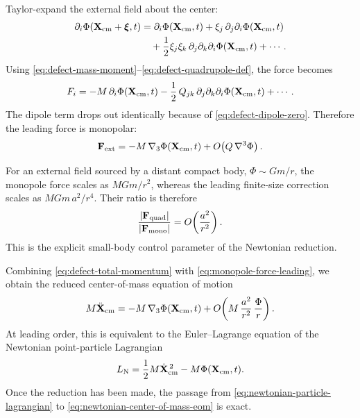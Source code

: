 \documentclass[11pt]{article}
\newcommand{\gradThree}{\nabla_3}
\newcommand{\PhiN}{\Phi}
\begin{document}
Taylor-expand the external field about the center:
\begin{align}
\partial_i \PhiN(\mathbf X_{\rm cm}+\boldsymbol{\xi},t)
&=
\partial_i\PhiN(\mathbf X_{\rm cm},t)
+
\xi_j\,\partial_j\partial_i\PhiN(\mathbf X_{\rm cm},t)
\nonumber\\
&\quad
+
\frac12\xi_j\xi_k\,\partial_j\partial_k\partial_i\PhiN(\mathbf X_{\rm cm},t)
+\cdots.
\label{eq:potential-taylor-expansion}
\end{align}
Using \eqref{eq:defect-mass-moment}--\eqref{eq:defect-quadrupole-def}, the force becomes
\begin{equation}
F_i
=
- M\,\partial_i\PhiN(\mathbf X_{\rm cm},t)
-\frac12\,Q_{jk}\,\partial_j\partial_k\partial_i\PhiN(\mathbf X_{\rm cm},t)
+\cdots.
\label{eq:force-multipole-expansion}
\end{equation}
The dipole term drops out identically because of
\eqref{eq:defect-dipole-zero}. Therefore the leading force is monopolar:
\begin{equation}
\mathbf F_{\rm ext}
=
- M\,\gradThree \PhiN(\mathbf X_{\rm cm},t)
+
O\!\left(Q\,\nabla^3\PhiN\right).
\label{eq:monopole-force-leading}
\end{equation}

For an external field sourced by a distant compact body,
\(\PhiN\sim Gm/r\), the monopole force scales as \(MGm/r^2\), whereas the leading
finite-size correction scales as \(MGm\,a^2/r^4\). Their ratio is therefore
\begin{equation}
\frac{|\mathbf F_{\rm quad}|}{|\mathbf F_{\rm mono}|}
=
O\!\left(\frac{a^2}{r^2}\right).
\label{eq:quadrupole-suppression}
\end{equation}
This is the explicit small-body control parameter of the Newtonian reduction.

Combining \eqref{eq:defect-total-momentum} with \eqref{eq:monopole-force-leading}, we
obtain the reduced center-of-mass equation of motion
\begin{equation}
M\ddot{\mathbf X}_{\rm cm}
=
- M\,\gradThree\PhiN(\mathbf X_{\rm cm},t)
+
O\!\left(M\,\frac{a^2}{r^2}\,\frac{\PhiN}{r}\right).
\label{eq:newtonian-center-of-mass-eom}
\end{equation}
At leading order, this is equivalent to the Euler--Lagrange equation of the Newtonian
point-particle Lagrangian
\begin{equation}
L_{\rm N}
=
\frac12 M\dot{\mathbf X}_{\rm cm}^{\,2}
-
M\PhiN(\mathbf X_{\rm cm},t).
\label{eq:newtonian-particle-lagrangian}
\end{equation}
Once the reduction has been made, the passage from
\eqref{eq:newtonian-particle-lagrangian} to
\eqref{eq:newtonian-center-of-mass-eom} is exact.
\end{document}
